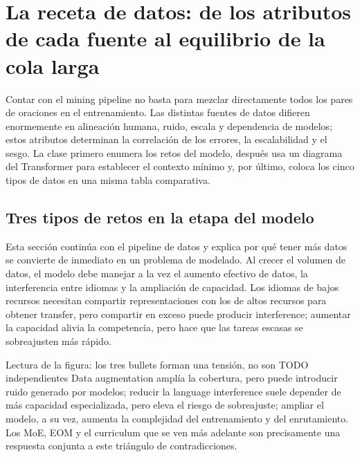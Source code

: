 \section{La receta de datos: de los atributos de cada fuente al equilibrio de la cola larga}

Contar con el mining pipeline no basta para mezclar directamente todos los pares de oraciones en el entrenamiento. Las distintas fuentes de datos difieren enormemente en alineación humana, ruido, escala y dependencia de modelos; estos atributos determinan la correlación de los errores, la escalabilidad y el sesgo. La clase primero enumera los retos del modelo, después usa un diagrama del Transformer para establecer el contexto mínimo y, por último, coloca los cinco tipos de datos en una misma tabla comparativa.

\subsection{Tres tipos de retos en la etapa del modelo}

Esta sección continúa con el pipeline de datos y explica por qué tener más datos se convierte de inmediato en un problema de modelado. Al crecer el volumen de datos, el modelo debe manejar a la vez el aumento efectivo de datos, la interferencia entre idiomas y la ampliación de capacidad. Los idiomas de bajos recursos necesitan compartir representaciones con los de altos recursos para obtener transfer, pero compartir en exceso puede producir interference; aumentar la capacidad alivia la competencia, pero hace que las tareas escasas se sobreajusten más rápido.


\begin{knowledgebox}{Lectura de la figura: los tres bullets forman una tensión, no son TODO independientes}
Data augmentation amplía la cobertura, pero puede introducir ruido generado por modelos; reducir la language interference suele depender de más capacidad especializada, pero eleva el riesgo de sobreajuste; ampliar el modelo, a su vez, aumenta la complejidad del entrenamiento y del enrutamiento. Los MoE, EOM y el curriculum que se ven más adelante son precisamente una respuesta conjunta a este triángulo de contradicciones.
\end{knowledgebox}

